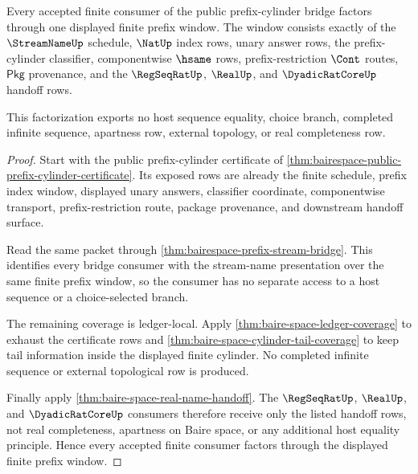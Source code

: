 \begin{theorem}
\label{thm:bairespace-finite-prefix-consumer-completeness}
Every accepted finite consumer of the public prefix-cylinder bridge factors
through one displayed finite prefix window. The window consists exactly of the
$\StreamNameUp$ schedule, $\NatUp$ index rows, unary answer rows, the
prefix-cylinder classifier, componentwise $\hsame$ rows, prefix-restriction
$\Cont$ routes, $\mathsf{Pkg}$ provenance, and the $\RegSeqRatUp$, $\RealUp$,
and $\DyadicRatCoreUp$ handoff rows.

This factorization exports no host sequence equality, choice branch, completed
infinite sequence, apartness row, external topology, or real completeness row.
\end{theorem}
\begin{proof}
Start with the public prefix-cylinder certificate of
\autoref{thm:bairespace-public-prefix-cylinder-certificate}. Its exposed rows
are already the finite schedule, prefix index window, displayed unary answers,
classifier coordinate, componentwise transport, prefix-restriction route,
package provenance, and downstream handoff surface.

Read the same packet through \autoref{thm:bairespace-prefix-stream-bridge}. This
identifies every bridge consumer with the stream-name presentation over the
same finite prefix window, so the consumer has no separate access to a host
sequence or a choice-selected branch.

The remaining coverage is ledger-local. Apply
\autoref{thm:baire-space-ledger-coverage} to exhaust the certificate rows and
\autoref{thm:baire-space-cylinder-tail-coverage} to keep tail information inside
the displayed finite cylinder. No completed infinite sequence or external
topological row is produced.

Finally apply \autoref{thm:baire-space-real-name-handoff}. The
$\RegSeqRatUp$, $\RealUp$, and $\DyadicRatCoreUp$ consumers therefore receive
only the listed handoff rows, not real completeness, apartness on Baire space,
or any additional host equality principle. Hence every accepted finite consumer
factors through the displayed finite prefix window.
\end{proof}

